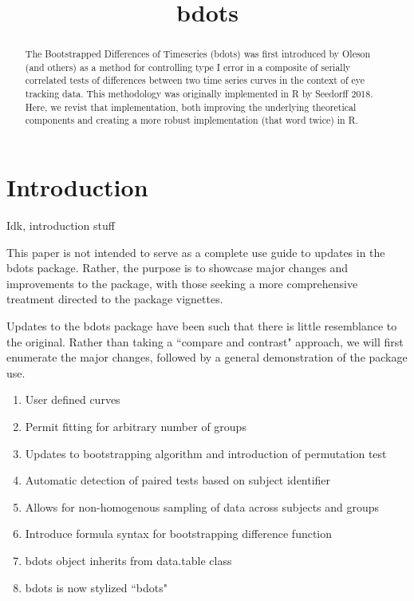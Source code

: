 \documentclass{article}
\title{bdots}
\date{}
\begin{document}

\maketitle

%

\begin{abstract}
The Bootstrapped Differences of Timeseries (bdots) was first introduced by Oleson (and others) as a method for controlling type I error in a composite of serially correlated tests of differences between two time series curves in the context of eye tracking data.  This methodology was originally implemented in R by Seedorff 2018. Here, we revist that implementation, both improving the underlying theoretical components and creating a more robust implementation (that word twice) in R. 
\end{abstract}

\section{Introduction}

Idk, introduction stuff

This paper is not intended to serve as a complete use guide to updates in the bdots package. Rather, the purpose is to showcase major changes and improvements to the package, with those seeking a more comprehensive treatment directed to the package vignettes. 

Updates to the bdots package have been such that there is little resemblance to the original. Rather than taking a ``compare and contrast" approach, we will first enumerate the major changes, followed by a general demonstration of the package use. 

\begin{enumerate}
\item User defined curves
\item Permit fitting for arbitrary number of groups
\item Updates to bootstrapping algorithm and introduction of permutation test
\item Automatic detection of paired tests based on subject identifier
\item Allows for non-homogenous sampling of data across subjects and groups
\item Introduce formula syntax for bootstrapping difference function
\item bdots object inherits from data.table class
\item bdots is now stylized ``bdots"
\end{enumerate}
\end{document}
